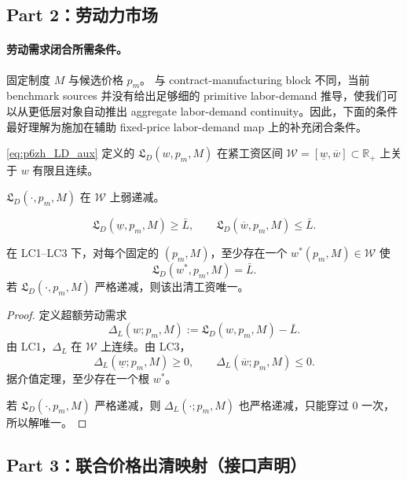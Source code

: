 \subsection{Part 2：劳动力市场}

\paragraph{劳动需求闭合所需条件。}
固定制度 $M$ 与候选价格 $p_m$。
与 contract-manufacturing block 不同，当前 benchmark sources 并没有给出足够细的 primitive labor-demand 推导，使我们可以从更低层对象自动推出 aggregate labor-demand continuity。因此，下面的条件最好理解为施加在辅助 fixed-price labor-demand map 上的补充闭合条件。
\begin{assumption}[LC1：可积性与连续性]
\eqref{eq:p6zh_LD_aux} 定义的 $\mathfrak L_D(w,p_m,M)$ 在紧工资区间 $\mathcal W=[\underline w,\overline w]\subset\mathbb R_+$ 上关于 $w$ 有限且连续。
\end{assumption}

\begin{assumption}[LC2：关于工资的单调性]
$\mathfrak L_D(\cdot,p_m,M)$ 在 $\mathcal W$ 上弱递减。
\end{assumption}

\begin{assumption}[LC3：端点跨越条件]
\[
\mathfrak L_D(\underline w,p_m,M)\ge \bar L,
\qquad
\mathfrak L_D(\overline w,p_m,M)\le \bar L.
\]
\end{assumption}

\begin{proposition}[劳动力市场出清工资的存在性]
在 LC1--LC3 下，对每个固定的 $(p_m,M)$，至少存在一个 $w^*(p_m,M)\in\mathcal W$ 使
\[
\mathfrak L_D(w^*,p_m,M)=\bar L.
\]
若 $\mathfrak L_D(\cdot,p_m,M)$ 严格递减，则该出清工资唯一。
\end{proposition}

\begin{proof}
定义超额劳动需求
\[
\Delta_L(w;p_m,M):=\mathfrak L_D(w,p_m,M)-\bar L.
\]
由 LC1，$\Delta_L$ 在 $\mathcal W$ 上连续。由 LC3，
\[
\Delta_L(\underline w;p_m,M)\ge 0,
\qquad
\Delta_L(\overline w;p_m,M)\le 0.
\]
据介值定理，至少存在一个根 $w^*$。

若 $\mathfrak L_D(\cdot,p_m,M)$ 严格递减，则 $\Delta_L(\cdot;p_m,M)$ 也严格递减，只能穿过 0 一次，所以解唯一。
\end{proof}

\subsection{Part 3：联合价格出清映射（接口声明）}

